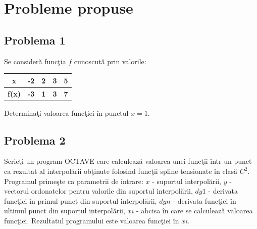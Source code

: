 \documentclass{exam}
\begin{document}

\section{Probleme propuse}


\subsection{Problema 1}

Se consideră funcţia $f$ cunoscută prin valorile:
\begin{center}
	\begin{tabular}{c || c | c | c | c}
		\textbf{x}    & \textbf{-2} & \textbf{2} & \textbf{3} & \textbf{5} \\
		\hline
		\textbf{f(x)} & \textbf{-3} & \textbf{1} & \textbf{3} & \textbf{7} \\
	\end{tabular}
\end{center}

Determinaţi valoarea funcţiei în punctul $x=1$.


\subsection{Problema 2}

Scrieţi un program OCTAVE care calculează valoarea unei funcţii într-un punct ca rezultat al interpolării obţinute folosind funcţii spline tensionate în clasă $C^2$. Programul primeşte ca parametrii de intrare: $x$ - suportul interpolării, $y$ - vectorul ordonatelor pentru valorile din suportul interpolării, $dy1$ - derivata funcţiei în primul punct din suportul interpolării, $dyn$ - derivata funcţiei în ultimul punct din suportul interpolării, $xi$ - abcisa în care se calculează valoarea funcţiei. Rezultatul programului este valoarea funcţiei în $xi$.
\end{document}
